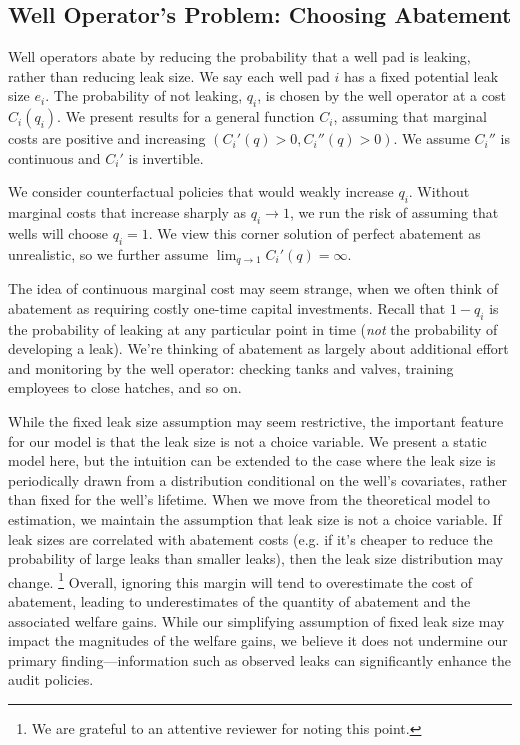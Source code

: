 \documentclass[12pt,oneside,letterpaper]{article}
\theoremstyle{definition}
\begin{document}
\begin{refsection}
\subsection{Well Operator's Problem: Choosing Abatement}
\label{sec:well-operator-problem-choosing-abatement}

\noindent
Well operators abate by reducing the probability that a well pad is leaking, rather than reducing leak size.
We say each well pad \(i\) has a fixed potential leak size \(e_i\).
The probability of not leaking, \(q_i\), is chosen by the well operator at a cost \(C_i(q_i)\).
We present results for a general function \(C_i\), assuming that marginal costs are positive and increasing \((C_i'(q) > 0, C_i''(q) > 0)\).
We assume \(C_i''\) is continuous and \(C_i'\) is invertible.

We consider counterfactual policies that would weakly increase \(q_i\).
Without marginal costs that increase sharply as \(q_i \to \text{1}\), we run the risk of assuming that wells will choose \(q_i = \text{1}\).
We view this corner solution of perfect abatement as unrealistic, so we
further assume
\(\lim_{q \to 1} C_i'(q) = \infty\).

The idea of continuous marginal cost may seem strange, when we often think of abatement as requiring costly one-time capital investments.
Recall that \(1 - q_i\) is the probability of leaking at any particular point in time (\emph{not} the probability of developing a leak).
We're thinking of abatement as largely about additional effort and monitoring by the well operator: checking tanks and valves, training employees to close hatches, and so on.

While the fixed leak size assumption may seem restrictive, the important feature for our model is that the leak size is not a choice variable.
We present a static model here, but the intuition can be extended to the case where the leak size is periodically drawn from a distribution conditional on the well's covariates, rather than fixed for the well's lifetime.
When we move from the theoretical model to estimation, we maintain the assumption that leak size is not a choice variable.
If leak sizes are correlated with abatement costs (e.g. if it's cheaper to reduce the probability of large leaks than smaller leaks), then the leak size distribution may change.%
\footnote{We are grateful to an attentive reviewer for noting this point.}
Overall, ignoring this margin will tend to overestimate the cost of abatement, leading to underestimates of the quantity of abatement and the associated welfare gains.
While our simplifying assumption of fixed leak size may impact the magnitudes of the welfare gains, we believe it does not undermine our primary finding---information such as observed leaks can significantly enhance the audit policies.


\end{refsection}
\end{document}
